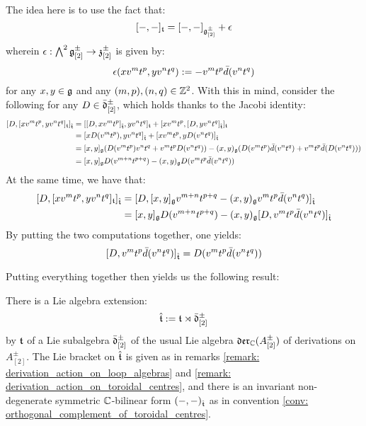 \begin{remark}
                The idea here is to use the fact that:
                    $$[-, -]_{\mathfrak{t}} = [-, -]_{\mathfrak{g}_{[2]}^{\pm}} + \epsilon$$
                wherein $\epsilon: \bigwedge^2 \mathfrak{g}_{[2]}^{\pm} \to \mathfrak{z}_{[2]}^{\pm}$ is given by:
                    $$\epsilon(x v^m t^p, y v^n t^q) := -v^m t^p \bar{d}(v^n t^q)$$
                for any $x, y \in \mathfrak{g}$ and any $(m, p), (n, q) \in \mathbb{Z}^2$. With this in mind, consider the following for any $D \in \bar{\mathfrak{d}}_{[2]}^{\pm}$, which holds thanks to the Jacobi identity:
                    $$
                        \begin{aligned}
                            [ D, [x v^m t^p, y v^n t^q]_{\t} ]_{\hat{\t}} & = [ [D, x v^m t^p]_{\hat{\t}}, y v^n t^q ]_{\t} + [ x v^m t^p, [D, y v^n t^q]_{\hat{\t}} ]_{\t}
                            \\
                            & = [x D(v^m t^p), y v^n t^q]_{\hat{\t}} + [x v^m t^p, y D(v^n t^q)]_{\hat{\t}}
                            \\
                            & = [x, y]_{\g} (D(v^m t^p) v^n t^q + v^m t^p D(v^n t^q)) - (x, y)_{\g} ( D(v^m t^p) \bar{d}(v^n t^q) + v^m t^p \bar{d}(D(v^n t^q)) )
                            \\
                            & = [x, y]_{\g} D(v^{m + n} t^{p + q}) - (x, y)_{\g} D( v^m t^p \bar{d}(v^n t^q) )
                        \end{aligned}
                    $$
                At the same time, we have that:
                    $$
                        \begin{aligned}
                            [ D, [x v^m t^p, y v^n t^q]_{\t} ]_{\hat{\t}} & = [ D, [x, y]_{\g} v^{m + n} t^{p + q} - (x, y)_{\g} v^m t^p \bar{d}(v^n t^q) ]_{\hat{\t}}
                            \\
                            & = [x, y]_{\g} D(v^{m + n} t^{p + q}) - (x, y)_{\g} [D, v^m t^p \bar{d}(v^n t^q)]_{\hat{\t}}
                        \end{aligned}
                    $$
                By putting the two computations together, one yields:
                    $$[D, v^m t^p \bar{d}(v^n t^q)]_{\hat{\mathfrak{t}}} = D( v^m t^p \bar{d}(v^n t^q) )$$
            \end{remark}

            Putting everything together then yields us the following result:
            \begin{proposition}
                There is a Lie algebra extension:
                    $$\hat{\mathfrak{t}} := \mathfrak{t} \rtimes \bar{\mathfrak{d}}_{[2]}^{\pm}$$
                by $\mathfrak{t}$ of a Lie subalgebra $\bar{\mathfrak{d}}_{[2]}^{\pm}$ of the usual Lie algebra $\mathfrak{der}_{\mathbb{C}}(A_{[2]}^{\pm})$ of derivations on $A_{[2]}^{\pm}$. The Lie bracket on $\hat{\mathfrak{t}}$ is given as in remarks \ref{remark: derivation_action_on_loop_algebras} and \ref{remark: derivation_action_on_toroidal_centres}, and there is an invariant non-degenerate symmetric $\mathbb{C}$-bilinear form $(-, -)_{\hat{\mathfrak{t}}}$ as in convention \ref{conv: orthogonal_complement_of_toroidal_centres}. 
            \end{proposition}
            
    \printbibliography

